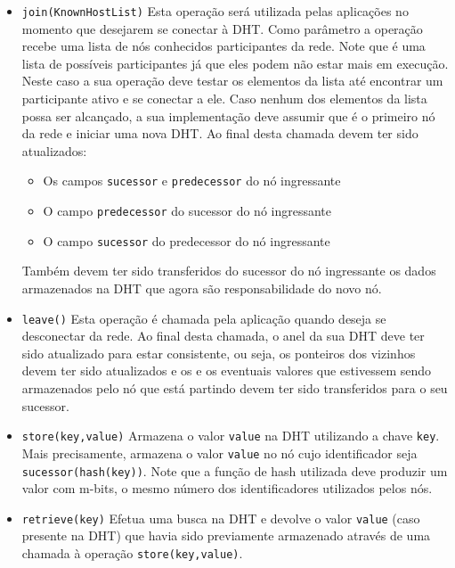 \documentclass[oneside,12pt,a4paper]{article}
\begin{document}
\begin{itemize}
\item \texttt{join(KnownHostList)} Esta operação será utilizada pelas
  aplicações no momento que desejarem se conectar à DHT. Como
  parâmetro a operação recebe uma lista de nós conhecidos
  participantes da rede. Note que é uma lista de possíveis
  participantes já que eles podem não estar mais em execução. Neste
  caso a sua operação deve testar os elementos da lista até encontrar
  um participante ativo e se conectar a ele. Caso nenhum dos elementos
  da lista possa ser alcançado, a sua implementação deve assumir que é
  o primeiro nó da rede e iniciar uma nova DHT. Ao final desta chamada
  devem ter sido atualizados:
  \begin{itemize}
  \item Os campos \texttt{sucessor} e \texttt{predecessor} do nó ingressante
  \item O campo \texttt{predecessor} do sucessor do nó ingressante
  \item O campo \texttt{sucessor} do predecessor do nó ingressante
  \end{itemize}

  Também devem ter sido transferidos do sucessor do nó ingressante os
  dados armazenados na DHT que agora são responsabilidade do novo nó.

\item \texttt{leave()} Esta operação é chamada pela aplicação quando
  deseja se desconectar da rede. Ao final desta chamada, o anel da sua
  DHT deve ter sido atualizado para estar consistente, ou seja, os
  ponteiros dos vizinhos devem ter sido atualizados e os e os
  eventuais valores que estivessem sendo armazenados pelo nó que está
  partindo devem ter sido transferidos para o seu sucessor.

\item \texttt{store(key,value)} Armazena o valor \texttt{value} na DHT
  utilizando a chave \texttt{key}. Mais precisamente, armazena o valor
  \texttt{value} no nó cujo identificador seja
  \texttt{sucessor(hash(key))}. Note que a função de hash utilizada
  deve produzir um valor com m-bits, o mesmo número dos
  identificadores utilizados pelos nós.

\item \texttt{retrieve(key)} Efetua uma busca na DHT e devolve o valor
  \texttt{value} (caso presente na DHT) que havia sido previamente
  armazenado através de uma chamada à operação
  \texttt{store(key,value)}.

\end{itemize}
\end{document}
